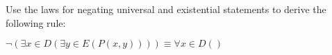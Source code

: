 \documentclass[12pt,letterpaper, onecolumn]{exam}
\begin{document}
\begin{questions}
\begin{solution}
	\end{solution}
	\question Use the laws for negating universal and existential statements to derive the following rule:\\
	\begin{center}
		$\neg (\exists x \in D(\exists y \in E(P(x,y)))) \equiv \forall x \in D()$
	\end{center}
\end{questions}
\end{document}
